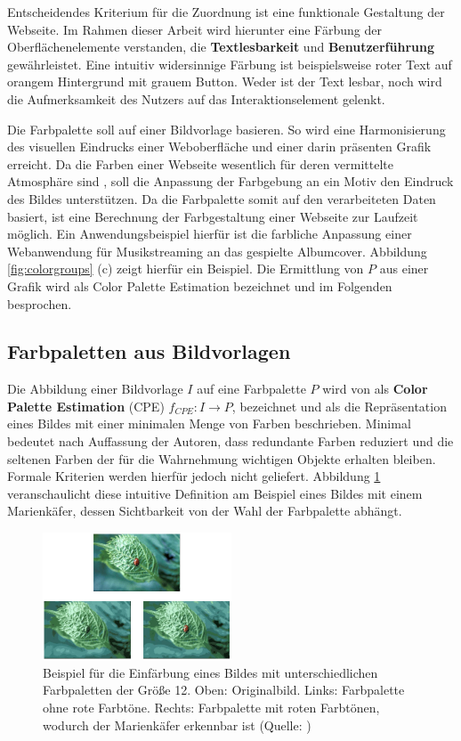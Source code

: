 Entscheidendes Kriterium für die Zuordnung  ist eine funktionale Gestaltung der Webseite. Im Rahmen dieser Arbeit wird hierunter eine Färbung der Oberflächenelemente verstanden, die \textbf{Textlesbarkeit} und \textbf{Benutzerführung} gewährleistet. Eine intuitiv widersinnige Färbung ist beispielsweise roter Text auf orangem Hintergrund mit grauem Button. Weder ist der Text lesbar, noch wird die Aufmerksamkeit des Nutzers auf das Interaktionselement gelenkt.

Die Farbpalette soll auf einer Bildvorlage basieren. So wird eine Harmonisierung des visuellen Eindrucks einer Weboberfläche und einer darin präsenten Grafik erreicht. Da die Farben einer Webseite wesentlich für deren vermittelte Atmosphäre sind \citep{webdesign}, soll die Anpassung der Farbgebung an ein Motiv den Eindruck des Bildes unterstützen. Da die Farbpalette somit auf den verarbeiteten Daten basiert, ist eine Berechnung der Farbgestaltung einer Webseite zur Laufzeit möglich. Ein Anwendungsbeispiel hierfür ist die farbliche Anpassung einer Webanwendung für Musikstreaming an das gespielte Albumcover. Abbildung \ref{fig:colorgroups} (c) zeigt hierfür ein Beispiel. Die Ermittlung von $P$ aus einer Grafik wird als Color Palette Estimation bezeichnet und im Folgenden besprochen.

\subsection{Farbpaletten aus Bildvorlagen}
\label{sec:bildvorlagen}

Die Abbildung einer Bildvorlage $I$ auf eine Farbpalette $P$ wird von \citet{acopa} als \textbf{Color Palette Estimation} (CPE) $f_{CPE}: I \to P$, bezeichnet und als die Repräsentation eines Bildes mit einer minimalen Menge von Farben beschrieben. \glqq{}Minimal\grqq{} bedeutet nach Auffassung der Autoren, dass redundante Farben reduziert und die seltenen Farben der für die Wahrnehmung wichtigen Objekte erhalten bleiben. Formale Kriterien werden hierfür jedoch nicht geliefert. Abbildung \ref{fig:ladybug} veranschaulicht diese intuitive Definition am Beispiel eines Bildes mit einem Marienkäfer, dessen Sichtbarkeit von der Wahl der Farbpalette abhängt.

\begin{figure}[h]
\centering
\includegraphics[width=0.5\textwidth]{img/ladybug.png}
\caption{Beispiel für die Einfärbung eines Bildes mit unterschiedlichen Farbpaletten der Größe 12. Oben: Originalbild. Links: Farbpalette ohne rote Farbtöne. Rechts: Farbpalette mit roten Farbtönen, wodurch der Marienkäfer erkennbar ist (Quelle: \citep{acopa})}
\label{fig:ladybug}
\end{figure}

